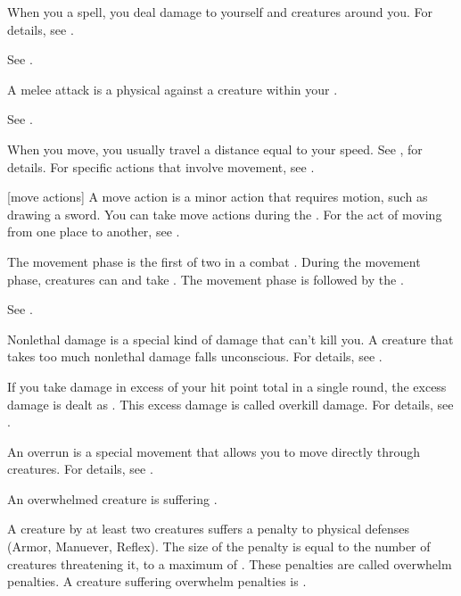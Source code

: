  When you  a spell, you deal damage to yourself and creatures around you.
For details, see .

 See .

 A melee attack is a physical  against a creature within your .

 See .

 When you move, you usually travel a distance equal to your speed.
See , for details.
For specific actions that involve movement, see .

[move actions] A move action is a minor action that requires motion, such as drawing a sword.
You can take move actions during the .
For the act of moving from one place to another, see .

 The movement phase is the first of two  in a combat .
During the movement phase, creatures can  and take .
The movement phase is followed by the .

 See .

 Nonlethal damage is a special kind of damage that can't kill you.
A creature that takes too much nonlethal damage falls unconscious.
For details, see .

 If you take damage in excess of your  hit point total in a single round, the excess damage is dealt as .
This excess damage is called overkill damage.
For details, see .

 An overrun is a special movement that allows you to move directly through creatures.
For details, see .

 An overwhelmed creature is suffering .

 A creature  by at least two creatures suffers a penalty to physical defenses (Armor, Manuever, Reflex).
The size of the penalty is equal to the number of creatures threatening it, to a maximum of .
These penalties are called overwhelm penalties.
A creature suffering overwhelm penalties is .

